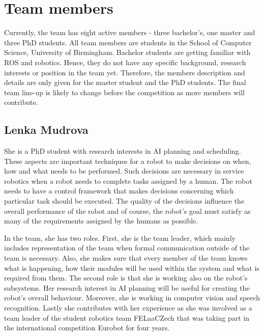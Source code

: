 
\section{Team members}
Currently, the team has eight active members - three bachelor's, one master and three PhD students. All team members are students in the School of Computer Science, University of Birmingham. Bachelor students are getting familiar with ROS and robotics. Hence, they do not have any specific background, research interests or position in the team yet. Therefore, the members description and details are only given for the master student and the PhD students. The final team line-up is likely to change before the competition as more members will contribute.

\subsection{Lenka Mudrova}

She is a PhD student with research interests in AI planning and scheduling. These aspects are important techniques for a robot to make decisions on when, how and what needs to be performed. Such decisions are necessary in service robotics when a robot needs to complete tasks assigned by a human. The robot needs to have a control framework that makes decisions concerning which particular task should be executed. The quality of the decisions influence the overall performance of the robot and of course, the robot's goal must satisfy as many of the requirements assigned by the humans as possible.

In the team, she has two roles. First, she is the team leader, which mainly includes representation of the team when formal communication outside of the team is necessary. Also, she makes sure that every member of the team knows what is happening, how their modules will be used within the system and what is required from them. The second role is that she is working also on the robot's subsystems. Her research interest in AI planning will be useful for creating the robot's overall behaviour. Moreover, she is working in computer vision and speech recognition. Lastly she contributes with her experience as she was involved as a team leader of the student robotics team FELaaCZech that was taking part in the international competition Eurobot for four years. 


